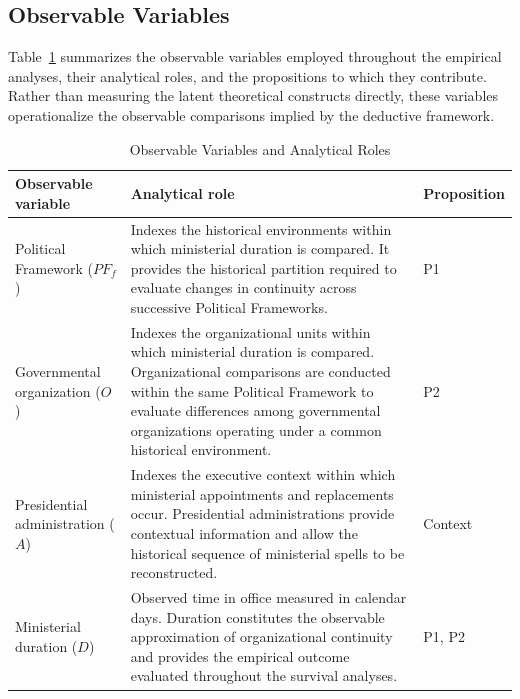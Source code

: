\documentclass[doc, 12pt, a4paper,floatsintext]{apa7}
\begin{document}
\subsection{Observable Variables}

Table~\ref{tab:variables} summarizes the observable variables employed throughout the empirical analyses, their analytical roles, and the propositions to which they contribute. Rather than measuring the latent theoretical constructs directly, these variables operationalize the observable comparisons implied by the deductive framework.
%
\begin{table}[!htbp]
\centering
\caption{Observable Variables and Analytical Roles}
\label{tab:variables}
\small
\renewcommand{\arraystretch}{1.25}
\begin{tabularx}{\textwidth}{p{3.3cm}Xp{2.0cm}}
\toprule
\textbf{Observable variable} &
\textbf{Analytical role} &
\textbf{Proposition} \\
\midrule

Political Framework ($PF_f$) &
Indexes the historical environments within which ministerial duration is compared. It provides the historical partition required to evaluate changes in continuity across successive Political Frameworks. &
P1 \\

\addlinespace

Governmental organization ($O$) &
Indexes the organizational units within which ministerial duration is compared. Organizational comparisons are conducted within the same Political Framework to evaluate differences among governmental organizations operating under a common historical environment. &
P2 \\

\addlinespace

Presidential administration ($A$) &
Indexes the executive context within which ministerial appointments and replacements occur. Presidential administrations provide contextual information and allow the historical sequence of ministerial spells to be reconstructed. &
Context \\

\addlinespace

Ministerial duration ($D$) &
Observed time in office measured in calendar days. Duration constitutes the observable approximation of organizational continuity and provides the empirical outcome evaluated throughout the survival analyses. &
P1, P2 \\


\end{tabularx}
\end{table}
\end{document}
